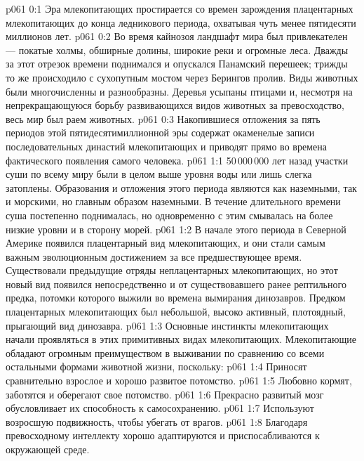 \author{Носитель Жизни}
\vs p061 0:1 Эра млекопитающих простирается со времен зарождения плацентарных млекопитающих до конца ледникового периода, охватывая чуть менее пятидесяти миллионов лет.
\vs p061 0:2 Во время кайнозоя ландшафт мира был привлекателен --- покатые холмы, обширные долины, широкие реки и огромные леса. Дважды за этот отрезок времени поднимался и опускался Панамский перешеек; трижды то же происходило с сухопутным мостом через Берингов пролив. Виды животных были многочисленны и разнообразны. Деревья усыпаны птицами и, несмотря на непрекращающуюся борьбу развивающихся видов животных за превосходство, весь мир был раем животных.
\vs p061 0:3 Накопившиеся отложения за пять периодов этой пятидесятимиллионной эры содержат окаменелые записи последовательных династий млекопитающих и приводят прямо во времена фактического появления самого человека.
\vs p061 1:1 50\,000\,000 лет назад участки суши по всему миру были в целом выше уровня воды или лишь слегка затоплены. Образования и отложения этого периода являются как наземными, так и морскими, но главным образом наземными. В течение длительного времени суша постепенно поднималась, но одновременно с этим смывалась на более низкие уровни и в сторону морей.
\vs p061 1:2 В начале этого периода в Северной Америке  появился плацентарный вид млекопитающих, и они стали самым важным эволюционным достижением за все предшествующее время. Существовали предыдущие отряды неплацентарных млекопитающих, но этот новый вид появился непосредственно и  от существовавшего ранее рептильного предка, потомки которого выжили во времена вымирания динозавров. Предком плацентарных млекопитающих был небольшой, высоко активный, плотоядный, прыгающий вид динозавра.
\vs p061 1:3 Основные инстинкты млекопитающих начали проявляться в этих примитивных видах млекопитающих. Млекопитающие обладают огромным преимуществом в выживании по сравнению со всеми остальными формами животной жизни, поскольку:
\vs p061 1:4 \bibnobreakspace Приносят сравнительно взрослое и хорошо развитое потомство.
\vs p061 1:5 \bibnobreakspace Любовно кормят, заботятся и оберегают свое потомство.
\vs p061 1:6 \bibnobreakspace Прекрасно развитый мозг обусловливает их способность к самосохранению.
\vs p061 1:7 \bibnobreakspace Используют возросшую подвижность, чтобы убегать от врагов.
\vs p061 1:8 \bibnobreakspace Благодаря превосходному интеллекту хорошо адаптируются и приспосабливаются к окружающей среде.
